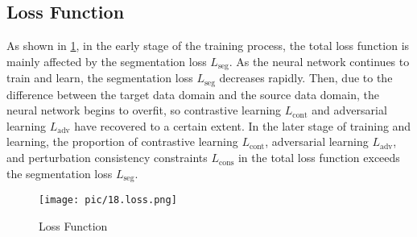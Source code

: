 \subsection{Loss Function}

As shown in \cref{fig:loss}, in the early stage of the training process, the total loss function is mainly affected by the segmentation loss $L_{\text{seg}}$. As the neural network continues to train and learn, the segmentation loss $L_{\text{seg}}$ decreases rapidly. Then, due to the difference between the target data domain and the source data domain, the neural network begins to overfit, so contrastive learning $L_{\text{cont}}$ and adversarial learning $L_{\text{adv}}$ have recovered to a certain extent. In the later stage of training and learning, the proportion of contrastive learning $L_{\text{cont}}$, adversarial learning $L_{\text{adv}}$, and perturbation consistency constraints $L_{\text{cons}}$ in the total loss function exceeds the segmentation loss $L_{\text{seg}}$.

\begin{figure}[htbp]
    \centering
    \texttt{[image: pic/18.loss.png]}
    \caption{Loss Function}
    \label{fig:loss}
\end{figure}

